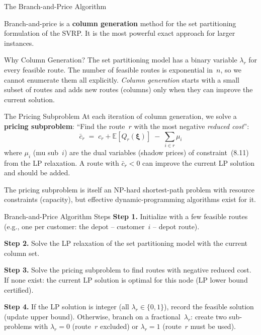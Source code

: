 \documentclass[aspectratio=169,10pt]{beamer}
\begin{document}
\begin{frame}[allowframebreaks]{The Branch-and-Price Algorithm}

  Branch-and-price is a \textbf{column generation} method for the set
  partitioning formulation of the SVRP.
  It is the most powerful exact approach for larger instances.

  \begin{block}{Why Column Generation?}
    The set partitioning model has a binary variable $\lambda_r$ for every
    feasible route.  The number of feasible routes is exponential in~$n$,
    so we cannot enumerate them all explicitly.
    \emph{Column generation} starts with a small subset of routes and
    adds new routes (columns) only when they can improve the current
    solution.
  \end{block}

  \begin{block}{The Pricing Subproblem}
    At each iteration of column generation, we solve a
    \textbf{pricing subproblem}: ``Find the route~$r$ with the most
    negative \emph{reduced cost}'':
    \[
      \bar{c}_r \;=\; c_r + \mathbb{E}[Q_r(\boldsymbol{\xi})]
                     \;-\; \sum_{i \in r} \mu_i
    \]
    where $\mu_i$ (mu sub~$i$) are the dual variables (shadow prices) of
    constraint~(8.11) from the LP relaxation.
    A route with $\bar{c}_r < 0$ can improve the current LP solution and
    should be added.

    The pricing subproblem is itself an NP-hard shortest-path problem
    with resource constraints (capacity), but effective dynamic-programming
    algorithms exist for it.
  \end{block}

  \framebreak

  \begin{block}{Branch-and-Price Algorithm Steps}
    \textbf{Step 1.} Initialize with a few feasible routes (e.g., one
    per customer: the depot -- customer~$i$ -- depot route).

    \textbf{Step 2.} Solve the LP relaxation of the set partitioning
    model with the current column set.

    \textbf{Step 3.} Solve the pricing subproblem to find routes with
    negative reduced cost.  If none exist: the current LP solution is
    optimal for this node (LP lower bound certified).

    \textbf{Step 4.} If the LP solution is integer (all $\lambda_r \in
    \{0,1\}$), record the feasible solution (update upper bound).
    Otherwise, branch on a fractional~$\lambda_r$: create two sub-problems
    with $\lambda_r = 0$ (route~$r$ excluded) or $\lambda_r = 1$
    (route~$r$ must be used).


\end{block}
\end{frame}
\end{document}
